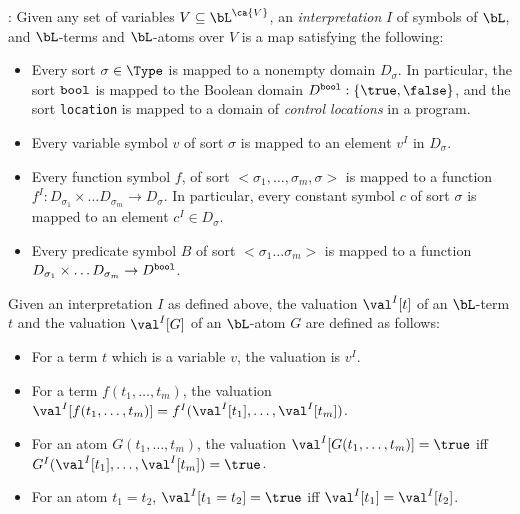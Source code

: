 : 
Given any set of variables $V \subseteq \bL^{\ca{V}}$, an {\em
interpretation} $I$ of symbols of $\bL$, and $\bL$-terms and $\bL$-atoms
over $V$ is a map satisfying the following: 

\begin{itemize}
\item Every sort $\sigma \in \Type$ is mapped to a nonempty domain
$D_{\sigma}$. In particular, the sort ${\tt bool}$ is mapped to the
Boolean domain $D^{\tt bool}:\{\true, \false\}$, and the sort {\tt location} is
mapped to a domain of {\em control locations} in a program. 
\item Every variable symbol $v$ of sort $\sigma$ is mapped to an
element $v^{I}$ in $D_{\sigma}$.
\item Every function symbol $f$, of sort $<\sigma_1, \ldots, \sigma_m,
\sigma>$ is mapped to a function $f^{I}: D_{\sigma_1} \times \ldots D_{\sigma_m} \to
D_{\sigma}$. In particular, every constant symbol $c$ of sort $\sigma$
is mapped to an element $c^{I} \in D_{\sigma}$. 
\item Every predicate symbol $B$ of sort $<\sigma_1 \ldots \sigma_m>$ 
is mapped to a function $D_{\sigma_1} \times \ldots D_{\sigma_m} \to
D^{\tt bool}$. 
\end{itemize}

Given an interpretation $I$ as defined above, the valuation
$\val^I[t]$ of an $\bL$-term $t$ and the valuation $\val^I[G]$ of an
$\bL$-atom $G$ are defined as follows:

\begin{itemize}
\item For a term $t$ which is a variable $v$, the valuation is $v^I$.
\item For a term $f(t_1, \ldots, t_m)$, the valuation $\val^I[f(t_1, \ldots,
t_m)] = f^I(\val^I[t_1], \ldots, \val^I[t_m])$. 
\item For an atom $G(t_1, \ldots, t_m)$, the valuation $\val^I[G(t_1, \ldots,
t_m)] = \true$ iff $G^I(\val^I[t_1], \ldots, \val^I[t_m]) = \true$. 
\item For an atom $t_1 = t_2$, $\val^I[t_1 = t_2] = \true$ iff 
$\val^I[t_1] = \val^I[t_2]$.  
\end{itemize}

